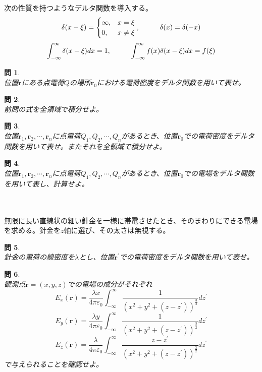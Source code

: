 \documentclass{jsarticle}
\newtheorem{pro}{問}[section]
\begin{document}
次の性質を持つようなデルタ関数を導入する。
\[\delta(x-\xi)=\begin{cases}
\infty, & x=\xi\\
0, & x\ne\xi\end{cases}, \hspace{10mm}\delta(x)=\delta(-x)\]
\[\int_{-\infty}^{\infty}\delta(x-\xi)dx=1,\hspace{10mm}\int_{-\infty}^{\infty}f(x)\delta(x-\xi)dx=f(\xi)\]

\begin{pro}~\\
位置\(\bm{r}\)にある点電荷\(Q\)の場所\(\bm{r}_{0}\)における電荷密度をデルタ関数を用いて表せ。
\end{pro}

\begin{pro}~\\
前問の式を全領域で積分せよ。
\end{pro}

\begin{pro}~\\
位置\(\bm{r}_{1},\bm{r}_{2},\cdots,\bm{r}_{n}\)に点電荷\(Q_{1},Q_{2},\cdots,Q_{n}\)があるとき、位置\(\bm{r}_{0}\)での電荷密度をデルタ関数を用いて表せ。またそれを全領域で積分せよ。
\end{pro}

\begin{pro}~\\
位置\(\bm{r}_{1},\bm{r}_{2},\cdots,\bm{r}_{n}\)に点電荷\(Q_{1},Q_{2},\cdots,Q_{n}\)があるとき、位置\(\bm{r}_{0}\)での電場をデルタ関数を用いて表し、計算せよ。
\end{pro}
~\\
~\\
無限に長い直線状の細い針金を一様に帯電させたとき、そのまわりにできる電場を求める。針金を\(z\)軸に選び、その太さは無視する。
\begin{pro}~\\
針金の電荷の線密度を\(\lambda\)とし、位置\(\bm{r}^{\prime}\)での電荷密度をデルタ関数を用いて表せ。
\end{pro}

\begin{pro}~\\
観測点\(\bm{r}=(x,y,z)\)での電場の成分がそれぞれ
\[E_{x}(\bm{r})=\frac{\lambda x}{4\pi\varepsilon_{0}}\int_{-\infty}^{\infty}\frac{1}{\left(x^{2}+y^{2}+(z-z^{\prime})\right)^{\frac{3}{2}}}dz^{\prime}\]
\[E_{y}(\bm{r})=\frac{\lambda y}{4\pi\varepsilon_{0}}\int_{-\infty}^{\infty}\frac{1}{\left(x^{2}+y^{2}+(z-z^{\prime})\right)^{\frac{3}{2}}}dz^{\prime}\]
\[E_{z}(\bm{r})=\frac{\lambda}{4\pi\varepsilon_{0}}\int_{-\infty}^{\infty}\frac{z-z^{\prime}}{\left(x^{2}+y^{2}+(z-z^{\prime})\right)^{\frac{3}{2}}}dz^{\prime}\]
で与えられることを確認せよ。
\end{pro}
\end{document}
